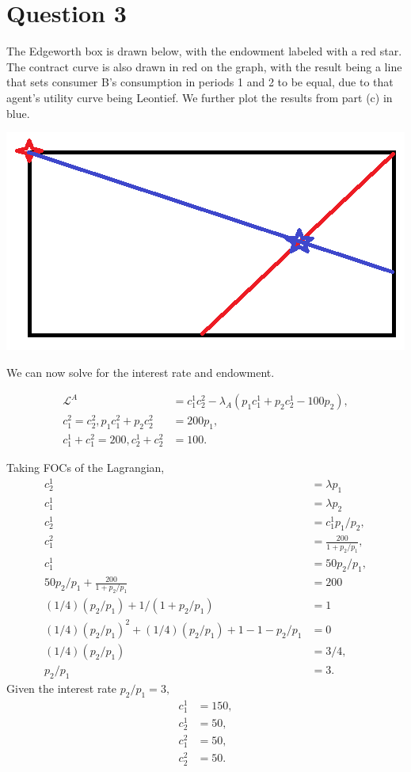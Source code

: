 \documentclass[11pt]{article} %
\begin{document}
\section{Question 3}
The Edgeworth box is drawn below, with the endowment labeled with a red star. The contract curve is also drawn in red on the graph, with the result being a line that sets consumer B's consumption in periods 1 and 2 to be equal, due to that agent's utility curve being Leontief. We further plot the results from part (c) in blue.

\includegraphics{edgeworth}

We can now solve for the interest rate and endowment.

\begin{align*}
\mathcal{L}^A &= c_1^1c_2^2 - \lambda_A (p_1c_1^1 + p_2c_2^1 - 100p_2),\\
c_1^2 = c_2^2, p_1c_1^2+p_2c_2^2 &= 200p_1,\\
c_1^1 + c_1^2 = 200, c_2^1 + c_2^2 &= 100.
\end{align*} 

Taking FOCs of the Lagrangian,
\begin{align*}
c_2^1 &= \lambda p_1 \\
c_1^1 &= \lambda p_2\\
c_2^1 &= c_1^1 p_1/p_2,\\
c_1^2 &= \frac{200}{1+p_2/p_1}, \\
c_1^1 &= 50 p_2/p_1,\\
50p_2/p_1 + \frac{200}{1+p_2/p_1} &= 200\\
(1/4)(p_2/p_1) + 1/(1+p_2/p_1) &= 1\\
(1/4)(p_2/p_1)^2 + (1/4)(p_2/p_1) +1 - 1 - p_2/p_1 &= 0  \\
(1/4)(p_2/p_1) &= 3/4,\\
p_2/p_1 &= 3.
\end{align*}
Given the interest rate $p_2/p_1 = 3,$
\begin{align*}
c_1^1 &= 150,\\
c_2^1 &= 50, \\
c_1^2 &= 50, \\
c_2^2 &= 50.
\end{align*}
\end{document}
